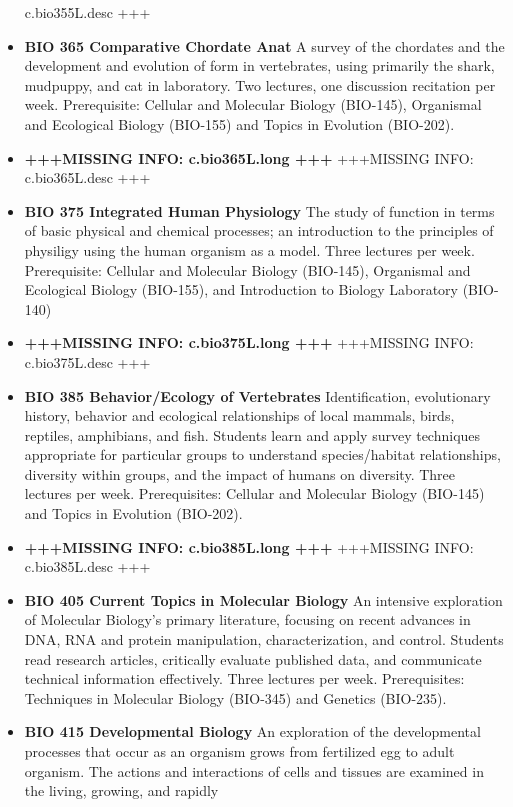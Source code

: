 \documentclass[
  letterpaper,
]{scrbook}
\begin{document}
\begin{itemize}
  c.bio355L.desc +++
\item
  \textbf{BIO 365 Comparative Chordate Anat} A survey of the chordates
  and the development and evolution of form in vertebrates, using
  primarily the shark, mudpuppy, and cat in laboratory. Two lectures,
  one discussion recitation per week. Prerequisite: Cellular and
  Molecular Biology (BIO-145), Organismal and Ecological Biology
  (BIO-155) and Topics in Evolution (BIO-202).
\item
  \textbf{+++MISSING INFO: c.bio365L.long +++} +++MISSING INFO:
  c.bio365L.desc +++
\item
  \textbf{BIO 375 Integrated Human Physiology} The study of function in
  terms of basic physical and chemical processes; an introduction to the
  principles of physiligy using the human organism as a model. Three
  lectures per week. Prerequisite: Cellular and Molecular Biology
  (BIO-145), Organismal and Ecological Biology (BIO-155), and
  Introduction to Biology Laboratory (BIO-140)
\item
  \textbf{+++MISSING INFO: c.bio375L.long +++} +++MISSING INFO:
  c.bio375L.desc +++
\item
  \textbf{BIO 385 Behavior/Ecology of Vertebrates} Identification,
  evolutionary history, behavior and ecological relationships of local
  mammals, birds, reptiles, amphibians, and fish. Students learn and
  apply survey techniques appropriate for particular groups to
  understand species/habitat relationships, diversity within groups, and
  the impact of humans on diversity. Three lectures per week.
  Prerequisites: Cellular and Molecular Biology (BIO-145) and Topics in
  Evolution (BIO-202).
\item
  \textbf{+++MISSING INFO: c.bio385L.long +++} +++MISSING INFO:
  c.bio385L.desc +++
\item
  \textbf{BIO 405 Current Topics in Molecular Biology} An intensive
  exploration of Molecular Biology's primary literature, focusing on
  recent advances in DNA, RNA and protein manipulation,
  characterization, and control. Students read research articles,
  critically evaluate published data, and communicate technical
  information effectively. Three lectures per week. Prerequisites:
  Techniques in Molecular Biology (BIO-345) and Genetics (BIO-235).
\item
  \textbf{BIO 415 Developmental Biology} An exploration of the
  developmental processes that occur as an organism grows from
  fertilized egg to adult organism. The actions and interactions of
  cells and tissues are examined in the living, growing, and rapidly

\end{itemize}
\end{document}
